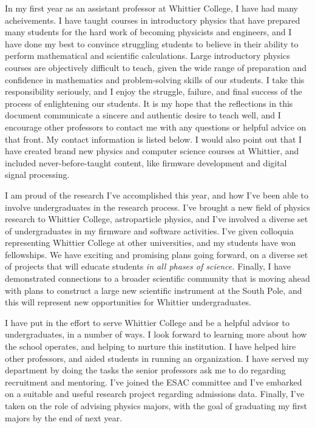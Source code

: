 \documentclass[../main.tex]{subfiles}
\begin{document}
In my first year as an assistant professor at Whittier College, I have had many acheivements.  I have taught courses in introductory physics that have prepared many students for the hard work of becoming physicists and engineers, and I have done my best to convince struggling students to believe in their ability to perform mathematical and scientific calculations.  Large introductory physics courses are objectively difficult to teach, given the wide range of preparation and confidence in mathematics and problem-solving skills of our students.  I take this responsibility seriously, and I enjoy the struggle, failure, and final success of the process of enlightening our students.  It is my hope that the reflections in this document communicate a sincere and authentic desire to teach well, and I encourage other professors to contact me with any questions or helpful advice on that front.  My contact information is listed below.  I would also point out that I have created brand new physics and computer science courses at Whittier, and included never-before-taught content, like firmware development and digital signal processing.  \\ \hspace{0.1cm}

I am proud of the research I've accomplished this year, and how I've been able to involve undergraduates in the research process.  I've brought a new field of physics research to Whittier College, astroparticle physics, and I've involved a diverse set of undergraduates in my firmware and software activities.  I've given colloquia representing Whittier College at other universities, and my students have won fellowships.  We have exciting and promising plans going forward, on a diverse set of projects that will educate students \textit{in all phases of science.}  Finally, I have demonstrated connections to a broader scientific community that is moving ahead with plans to construct a large new scientific instrument at the South Pole, and this will represent new opportunities for Whittier undergraduates. \\ \hspace{0.1cm}

I have put in the effort to serve Whittier College and be a helpful advisor to undergraduates, in a number of ways.  I look forward to learning more about how the school operates, and helping to nurture this institution.  I have helped hire other professors, and aided students in running an organization.  I have served my department by doing the tasks the senior professors ask me to do regarding recruitment and mentoring.  I've joined the ESAC committee and I've embarked on a suitable and useful research project regarding admissions data.  Finally, I've taken on the role of advising physics majors, with the goal of graduating my first majors by the end of next year. \\ \hspace{0.1cm}
\end{document}
